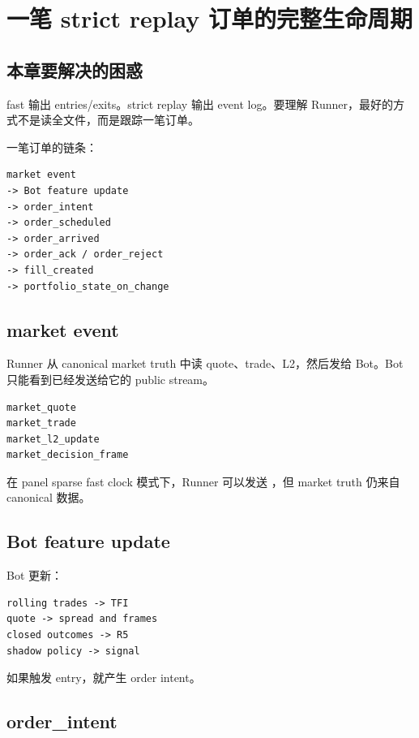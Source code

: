 \chapter{一笔 strict replay 订单的完整生命周期}

\section{本章要解决的困惑}

fast 输出 entries/exits。strict replay 输出 event log。要理解 Runner，最好的方式不是读全文件，而是跟踪一笔订单。

一笔订单的链条：

\begin{lstlisting}
market event
-> Bot feature update
-> order_intent
-> order_scheduled
-> order_arrived
-> order_ack / order_reject
-> fill_created
-> portfolio_state_on_change
\end{lstlisting}

\section{market event}

Runner 从 canonical market truth 中读 quote、trade、L2，然后发给 Bot。Bot 只能看到已经发送给它的 public stream。

\begin{lstlisting}
market_quote
market_trade
market_l2_update
market_decision_frame
\end{lstlisting}

在 panel sparse fast clock 模式下，Runner 可以发送 ，但 market truth 仍来自 canonical 数据。

\section{Bot feature update}

Bot 更新：

\begin{lstlisting}
rolling trades -> TFI
quote -> spread and frames
closed outcomes -> R5
shadow policy -> signal
\end{lstlisting}

如果触发 entry，就产生 order intent。

\section{order\_intent}

